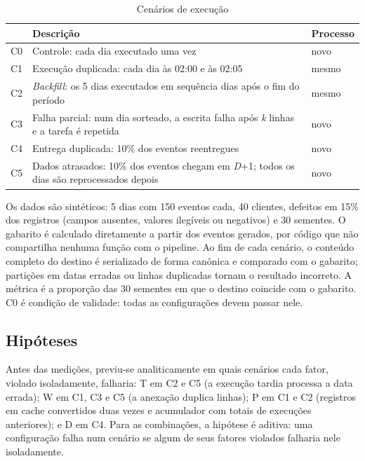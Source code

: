 \begin{table}[t]
  \caption{Cenários de execução}
  \label{tab:cenarios}
  \small
  \begin{tabular}{l>{\raggedright\arraybackslash}p{}l}
    \toprule
    & Descrição & Processo \\
    \midrule
    C0 & Controle: cada dia executado uma vez & novo \\
    C1 & Execução duplicada: cada dia às 02:00 e às 02:05 & mesmo \\
    C2 & \emph{Backfill}: os 5 dias executados em sequência dias após o fim do período & mesmo \\
    C3 & Falha parcial: num dia sorteado, a escrita falha após \emph{k} linhas e a tarefa é repetida & novo \\
    C4 & Entrega duplicada: 10\% dos eventos reentregues & novo \\
    C5 & Dados atrasados: 10\% dos eventos chegam em \emph{D}+1; todos os dias são reprocessados depois & novo \\
    \bottomrule
  \end{tabular}
\end{table}

Os dados são sintéticos: 5 dias com 150 eventos cada, 40 clientes, defeitos em 15\% dos registros (campos ausentes, valores ilegíveis ou negativos) e 30 sementes. O gabarito é calculado diretamente a partir dos eventos gerados, por código que não compartilha nenhuma função com o pipeline. Ao fim de cada cenário, o conteúdo completo do destino é serializado de forma canônica e comparado com o gabarito; partições em datas erradas ou linhas duplicadas tornam o resultado incorreto. A métrica é a proporção das 30 sementes em que o destino coincide com o gabarito. C0 é condição de validade: todas as configurações devem passar nele.

\subsection{Hipóteses}

Antes das medições, previu-se analiticamente em quais cenários cada fator, violado isoladamente, falharia: T em C2 e C5 (a execução tardia processa a data errada); W em C1, C3 e C5 (a anexação duplica linhas); P em C1 e C2 (registros em cache convertidos duas vezes e acumulador com totais de execuções anteriores); e D em C4. Para as combinações, a hipótese é aditiva: uma configuração falha num cenário se algum de seus fatores violados falharia nele isoladamente.

